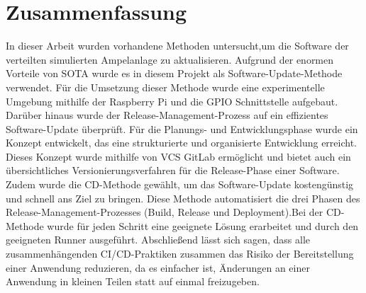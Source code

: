 \chapter{Zusammenfassung}

In dieser Arbeit wurden vorhandene Methoden untersucht,um die Software der verteilten
simulierten Ampelanlage zu aktualisieren. Aufgrund der enormen Vorteile von SOTA wurde es in diesem Projekt als Software-Update-Methode verwendet. Für die Umsetzung dieser Methode wurde eine experimentelle Umgebung mithilfe der Raspberry Pi und die GPIO Schnittstelle aufgebaut. Darüber hinaus wurde der Release-Management-Prozess auf ein effizientes Software-Update überprüft. Für die Planungs- und Entwicklungsphase wurde ein Konzept entwickelt, das eine strukturierte und organisierte Entwicklung erreicht. Dieses Konzept wurde mithilfe von VCS GitLab ermöglicht und bietet auch ein übersichtliches Versionierungsverfahren für die Release-Phase einer Software. Zudem wurde die CD-Methode gewählt, um das Software-Update kostengünstig und schnell ans Ziel zu bringen. Diese Methode automatisiert die drei Phasen des Release-Management-Prozesses (Build, Release und Deployment).Bei der CD-Methode wurde für jeden Schritt eine geeignete Lösung erarbeitet und durch den geeigneten Runner ausgeführt.
\newline \newline
Abschließend lässt sich sagen, dass alle zusammenhängenden CI/CD-Praktiken zusammen das Risiko der Bereitstellung einer Anwendung reduzieren, da es einfacher ist, Änderungen an einer Anwendung in kleinen Teilen statt auf einmal freizugeben.

